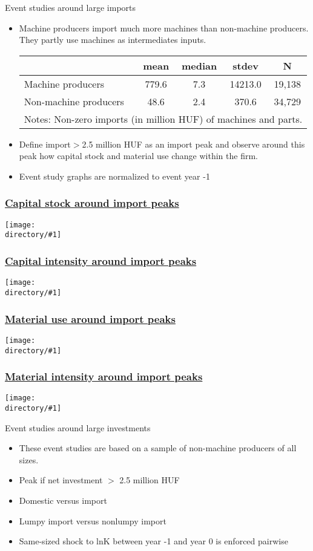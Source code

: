 \documentclass[10pt]{beamer}
\newcommand{\directory}{figures}
\newcommand{\longfigure}[2]{\begin{frame}\frametitle{\hyperlink{#1back}{#2}}\hypertarget{#1}{{\begin{center}\texttt{[image: \\directory/\#1]}\end{center}}}\end{frame}}
\begin{document}
\begin{frame}{Event studies around large imports}
\begin{itemize}
	\item Machine producers import much more machines than non-machine producers. They partly use machines as intermediates inputs.
\begin{table}
	\renewcommand{\baselinestretch}{1.2}  \scriptsize \centering
	\begin{tabular}{lcccc}
		\hline \hline
		  & mean & median & stdev & N \\ \hline
		Machine producers & 779.6 & 7.3   & 14213.0 & 19,138 \\
		Non-machine producers & 48.6  & 2.4   & 370.6 & 34,729 \\
		\hline \hline
		\multicolumn{5}{l}{%
			\begin{minipage}{7cm}
				\scriptsize Notes: Non-zero imports (in million HUF) of machines and parts.%
			\end{minipage}%
		}\\
	\end{tabular}%
	\renewcommand{\baselinestretch}{1.62}\normalsize \setlength{\baselineskip}{0.65\baselineskip}
\end{table}
\bigskip
	\item Define import$>$2.5 million HUF as an import peak and observe around this peak how capital stock and material use change within the firm.
	\item Event study graphs are normalized to event year -1
\end{itemize}
\end{frame}

\longfigure{ES_import_lnK}{Capital stock around import peaks}
\longfigure{ES_import_ln_K_L}{Capital intensity around import peaks}
\longfigure{ES_import_lnM}{Material use around import peaks}
\longfigure{ES_import_ln_M_L}{Material intensity around import peaks}

\begin{frame}{Event studies around large investments}
\begin{itemize}
	\item These event studies are based on a sample of non-machine producers of all sizes.
	\item Peak if net investment $>$ 2.5 million HUF
	\item Domestic versus import
	\item Lumpy import versus nonlumpy import
	\item Same-sized shock to lnK between year -1 and year 0 is enforced pairwise
\end{itemize}
\end{frame}
\end{document}
